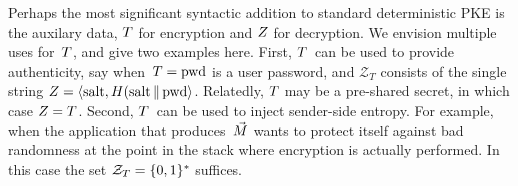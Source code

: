 Perhaps the most significant syntactic addition to standard deterministic PKE is the auxilary data, $T$ for encryption and $Z$ for decryption.  We envision multiple uses for~$T$, and give two examples here.  First, $T$~can be used to provide authenticity, say when~$T=\mathrm{pwd}$ is a user password, and $\mathcal{Z}_T$ consists of the single string $Z=\langle \mathrm{salt},H(\mathrm{salt} \,\|\, \mathrm{pwd} \rangle$.  Relatedly, $T$ may be a pre-shared secret, in which case $Z=T$.  Second, $T$~can be used to inject sender-side entropy.  For example, when the application that produces~$\vec{M}$ wants to protect itself against bad randomness at the point in the stack where encryption is actually performed.  In this case the set $\mathcal{Z}_T=\{0,1\}^*$ suffices. 









